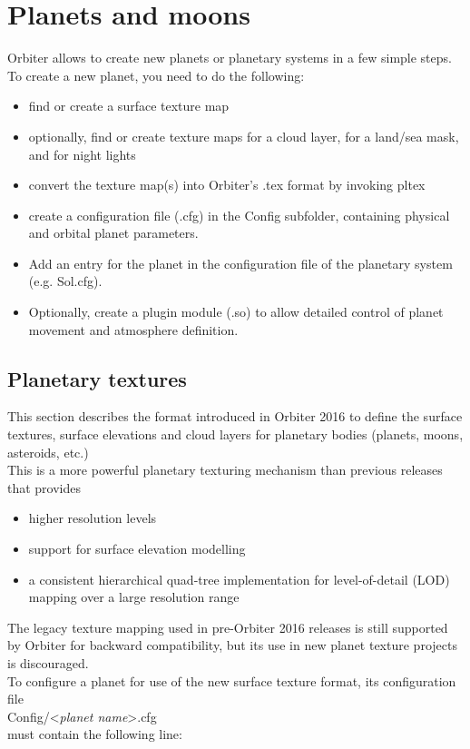 \documentclass[Orbiter Developer Manual.tex]{subfiles}
\begin{document}
\section{Planets and moons}
Orbiter allows to create new planets or planetary systems in a few simple steps. To create a new planet, you need to do the following:

\begin{itemize}
\item find or create a surface texture map
\item optionally, find or create texture maps for a cloud layer, for a land/sea mask, and for night lights
\item convert the texture map(s) into Orbiter's .tex format by invoking pltex
\item create a configuration file (.cfg) in the Config subfolder, containing physical and orbital planet parameters.
\item Add an entry for the planet in the configuration file of the planetary system (e.g. Sol.cfg).
\item Optionally, create a plugin module (.so) to allow detailed control of planet movement and atmosphere definition.
\end{itemize}


\subsection{Planetary textures}
\label{ssec:planetery_tex}
This section describes the format introduced in Orbiter 2016 to define the surface textures, surface elevations and cloud layers for planetary bodies (planets, moons, asteroids, etc.)\\
This is a more powerful planetary texturing mechanism than previous releases that provides

\begin{itemize}
\item higher resolution levels
\item support for surface elevation modelling
\item a consistent hierarchical quad-tree implementation for level-of-detail (LOD) mapping over a large resolution range
\end{itemize}

\noindent
The legacy texture mapping used in pre-Orbiter 2016 releases is still supported by Orbiter for backward compatibility, but its use in new planet texture projects is discouraged.
\\
To configure a planet for use of the new surface texture format, its configuration file\\
\indent Config/<\textit{planet name}>.cfg\\
must contain the following line:
\end{document}
